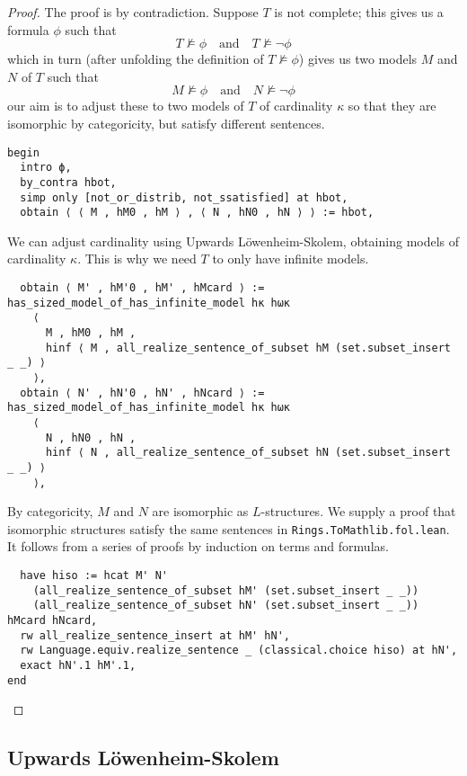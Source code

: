 \begin{proof}
The proof is by contradiction.
Suppose $T$ is not complete;
this gives us a formula $\phi$ such that
\[ T \nvDash \phi \quad \text{and} \quad T \nvDash \neg \phi \]
which in turn (after unfolding the definition of $T \nvDash \phi$)
gives us two models $M$ and $N$ of $T$ such that
\[ M \nvDash \phi \quad \text{and} \quad N \nvDash \neg \phi \]
our aim is to adjust these to two models of $T$
of cardinality $\kappa$ so that they are isomorphic by categoricity,
but satisfy different sentences.

\begin{lstlisting}
begin
  intro ϕ,
  by_contra hbot,
  simp only [not_or_distrib, not_ssatisfied] at hbot,
  obtain ⟨ ⟨ M , hM0 , hM ⟩ , ⟨ N , hN0 , hN ⟩ ⟩ := hbot,
\end{lstlisting}

We can adjust cardinality using Upwards L\"{o}wenheim-Skolem,
obtaining models of cardinality $\kappa$.
This is why we need $T$ to only have infinite models.
\begin{lstlisting}
  obtain ⟨ M' , hM'0 , hM' , hMcard ⟩ := has_sized_model_of_has_infinite_model hκ hωκ
    ⟨
      M , hM0 , hM ,
      hinf ⟨ M , all_realize_sentence_of_subset hM (set.subset_insert _ _) ⟩
    ⟩,
  obtain ⟨ N' , hN'0 , hN' , hNcard ⟩ := has_sized_model_of_has_infinite_model hκ hωκ
    ⟨
      N , hN0 , hN ,
      hinf ⟨ N , all_realize_sentence_of_subset hN (set.subset_insert _ _) ⟩
    ⟩, \end{lstlisting}

By categoricity, $M$ and $N$ are isomorphic as $L$-structures.
We supply a proof that isomorphic structures satisfy the same
sentences in \texttt{Rings.ToMathlib.fol.lean}.
It follows from a series of proofs by induction on terms and formulas.

\begin{lstlisting}
  have hiso := hcat M' N'
    (all_realize_sentence_of_subset hM' (set.subset_insert _ _))
    (all_realize_sentence_of_subset hN' (set.subset_insert _ _)) hMcard hNcard,
  rw all_realize_sentence_insert at hM' hN',
  rw Language.equiv.realize_sentence _ (classical.choice hiso) at hN',
  exact hN'.1 hM'.1,
end
\end{lstlisting}
\end{proof}

\subsection{Upwards L\"{o}wenheim-Skolem}

